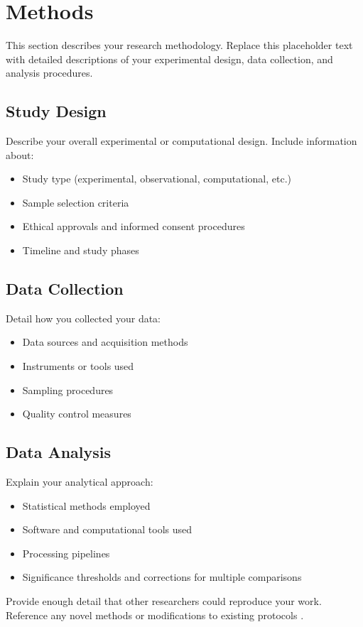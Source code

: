 
\section{Methods}

This section describes your research methodology. Replace this placeholder text with detailed descriptions of your experimental design, data collection, and analysis procedures.

\subsection{Study Design}

Describe your overall experimental or computational design. Include information about:
\begin{itemize}
    \item Study type (experimental, observational, computational, etc.)
    \item Sample selection criteria
    \item Ethical approvals and informed consent procedures
    \item Timeline and study phases
\end{itemize}

\subsection{Data Collection}

Detail how you collected your data:
\begin{itemize}
    \item Data sources and acquisition methods
    \item Instruments or tools used
    \item Sampling procedures
    \item Quality control measures
\end{itemize}

\subsection{Data Analysis}

Explain your analytical approach:
\begin{itemize}
    \item Statistical methods employed
    \item Software and computational tools used
    \item Processing pipelines
    \item Significance thresholds and corrections for multiple comparisons
\end{itemize}

Provide enough detail that other researchers could reproduce your work. Reference any novel methods or modifications to existing protocols \cite{example_method_2019}.

